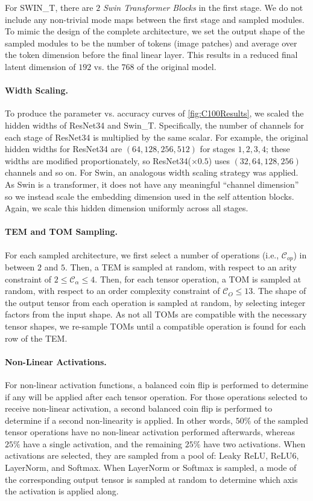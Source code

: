 \documentclass{article}
\theoremstyle{plain}
\theoremstyle{definition}
\theoremstyle{remark}
\newcommand{\cC}{\mathcal{C}}
\let\oldparagraph\paragraph
\renewcommand{\paragraph}[1]{%
	\vspace{-0.5em}%
	\oldparagraph{#1}%
}
\begin{document}
For SWIN\_T, there are $2$ \textit{Swin Transformer Blocks} in the first stage. We do not include any non-trivial mode maps between the first stage and sampled modules. To mimic the design of the complete architecture, we set the output shape of the sampled modules to be the number of tokens (image patches) and average over the token dimension before the final linear layer. This results in a reduced final latent dimension of $192$ vs. the $768$ of the original model.

\paragraph{Width Scaling.} To produce the parameter vs. accuracy curves of \cref{fig:C100Results}, we scaled the hidden widths of ResNet34 and Swin\_T. Specifically, the number of channels for each stage of ResNet34 is multiplied by the same scalar. For example, the original hidden widths for ResNet34 are $(64, 128, 256, 512)$ for stages $1, 2, 3, 4$; these widths are modified proportionately, so ResNet34($\times 0.5$) uses $(32, 64, 128, 256)$ channels and so on. For Swin, an analogous width scaling strategy was applied. As Swin is a transformer, it does not have any meaningful ``channel dimension'' so we instead scale the embedding dimension used in the self attention blocks. Again, we scale this hidden dimension uniformly across all stages. 

\paragraph{TEM and TOM Sampling.} For each sampled architecture, we first select a number of operations (i.e., $\cC_{op}$) in between $2$ and $5$. Then, a TEM is sampled at random, with respect to an arity constraint of $2 \leq \cC_{\alpha} \leq 4$. Then, for each tensor operation, a TOM is sampled at random, with respect to an order complexity constraint of $\cC_O \leq 13$. The shape of the output tensor from each operation is sampled at random, by selecting integer factors from the input shape. As not all TOMs are compatible with the necessary tensor shapes, we re-sample TOMs until a compatible operation is found for each row of the TEM.

\paragraph{Non-Linear Activations.} For non-linear activation functions, a balanced coin flip is performed to determine if any will be applied after each tensor operation. For those operations selected to receive non-linear activation, a second balanced coin flip is performed to determine if a second non-linearity is applied. In other words, $50\%$ of the sampled tensor operations have no non-linear activation performed afterwards, whereas $25\%$ have a single activation, and the remaining $25\%$ have two activations. When activations are selected, they are sampled from a pool of: Leaky ReLU, ReLU6, LayerNorm, and Softmax. When LayerNorm or Softmax is sampled, a mode of the corresponding output tensor is sampled at random to determine which axis the activation is applied along.
\end{document}
